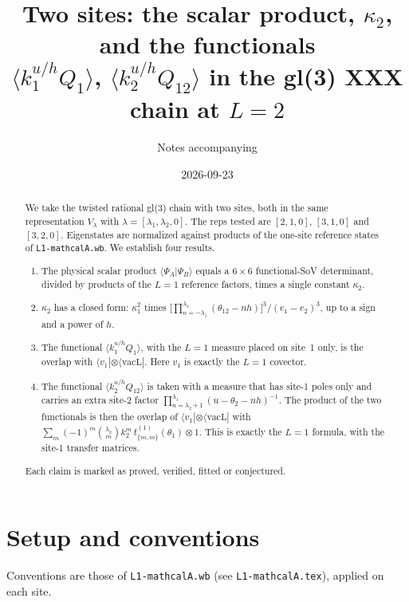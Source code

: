 \documentclass[11pt]{article}
\title{Two sites: the scalar product, $\kappa_2$, and the functionals\\
$\langle k_1^{u/h}Q_1\rangle$, $\langle k_2^{u/h}Q_{12}\rangle$ in the gl(3) XXX chain at $L=2$}
\author{Notes accompanying \nb{L2-mathcalA.wb}}
\date{2026-09-23}
\newcommand{\vacL}{\langle\mathrm{vacL}|}
\newcommand{\nb}[1]{\texttt{#1}}
\theoremstyle{definition}
\theoremstyle{remark}
\begin{document}
\maketitle

\begin{abstract}
We take the twisted rational gl(3) chain with two sites, both in the same representation $V_\lambda$ with $\lambda=[\lambda_1,\lambda_2,0]$. The reps tested are $[2,1,0]$, $[3,1,0]$ and $[3,2,0]$. Eigenstates are normalized against products of the one-site reference states of \nb{L1-mathcalA.wb}. We establish four results.
\begin{enumerate}
\item The physical scalar product $\langle\Psi_A|\Psi_B\rangle$ equals a $6\times6$ functional-SoV determinant, divided by products of the $L=1$ reference factors, times a single constant $\kappa_2$.
\item $\kappa_2$ has a closed form: $\kappa_1^2$ times $\big[\prod_{n=-\lambda_1}^{\lambda_1}(\theta_{12}-nh)\big]^3/(e_1-e_2)^3$, up to a sign and a power of $h$.
\item The functional $\langle k_1^{u/h}Q_1\rangle$, with the $L=1$ measure placed on site~1 only, is the overlap with $\langle v_1|\otimes\vacL$. Here $v_1$ is exactly the $L=1$ covector.
\item The functional $\langle k_2^{u/h}Q_{12}\rangle$ is taken with a measure that has site-1 poles only and carries an extra site-2 factor $\prod_{n=\lambda_2+1}^{\lambda_1}(u-\theta_2-nh)^{-1}$. The product of the two functionals is then the overlap of $\langle v_1|\otimes\vacL$ with $\sum_m(-1)^m\binom{\lambda_2}{m}k_2^m\,t^{(1)}_{\{m,m\}}(\theta_1)\otimes1$. This is exactly the $L=1$ formula, with the site-1 transfer matrices.
\end{enumerate}
Each claim is marked as proved, verified, fitted or conjectured.
\end{abstract}

\tableofcontents

\section{Setup and conventions}\label{sec:setup}

Conventions are those of \nb{L1-mathcalA.wb} (see \nb{L1-mathcalA.tex}), applied on each site.
\end{document}
